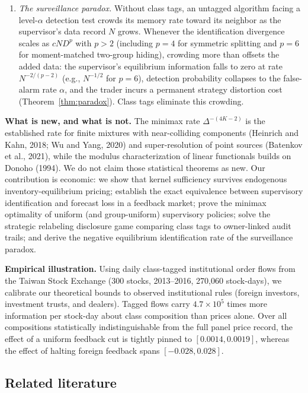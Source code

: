 \documentclass[11pt,letterpaper]{article}
\theoremstyle{definition}
\begin{document}
\begin{enumerate}
  \item \emph{The surveillance paradox.} Without class tags, an untagged algorithm facing a level-$\alpha$ detection test crowds its memory rate toward its neighbor as the supervisor's data record $N$ grows. Whenever the identification divergence scales as $c N D^p$ with $p > 2$ (including $p=4$ for symmetric splitting and $p=6$ for moment-matched two-group hiding), crowding more than offsets the added data: the supervisor's equilibrium information falls to zero at rate $N^{-2/(p-2)}$ (e.g., $N^{-1/2}$ for $p=6$), detection probability collapses to the false-alarm rate $\alpha$, and the trader incurs a permanent strategy distortion cost (Theorem~\ref{thm:paradox}). Class tags eliminate this crowding.
\end{enumerate}

\textbf{What is new, and what is not.} The minimax rate $\Delta^{-(4K-2)}$ is the established rate for finite mixtures with near-colliding components (Heinrich and Kahn, 2018; Wu and Yang, 2020) and super-resolution of point sources (Batenkov et al., 2021), while the modulus characterization of linear functionals builds on Donoho (1994). We do not claim those statistical theorems as new. Our contribution is economic: we show that kernel sufficiency survives endogenous inventory-equilibrium pricing; establish the exact equivalence between supervisory identification and forecast loss in a feedback market; prove the minimax optimality of uniform (and group-uniform) supervisory policies; solve the strategic relabeling disclosure game comparing class tags to owner-linked audit trails; and derive the negative equilibrium identification rate of the surveillance paradox.

\textbf{Empirical illustration.} Using daily class-tagged institutional order flows from the Taiwan Stock Exchange (300 stocks, 2013--2016, 270,060 stock-days), we calibrate our theoretical bounds to observed institutional rules (foreign investors, investment trusts, and dealers). Tagged flows carry $4.7 \times 10^5$ times more information per stock-day about class composition than prices alone. Over all compositions statistically indistinguishable from the full panel price record, the effect of a uniform feedback cut is tightly pinned to $[0.0014, 0.0019]$, whereas the effect of halting foreign feedback spans $[-0.028, 0.028]$.

\subsection{Related literature}
\end{document}
